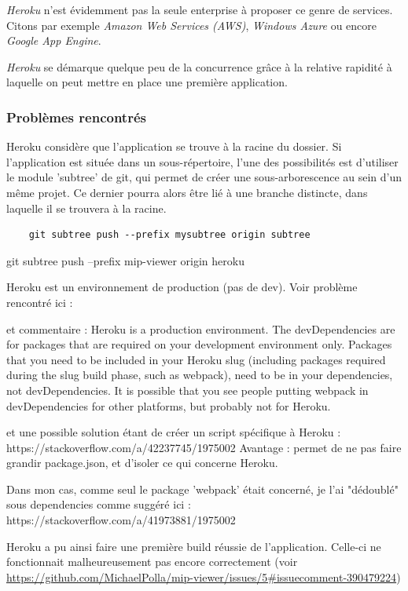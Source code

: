 \textit{Heroku} n'est évidemment pas la seule enterprise à proposer ce genre de services. Citons par exemple \textit{Amazon Web Services (AWS)}, \textit{Windows Azure} ou encore \textit{Google App Engine}.

\textit{Heroku} se démarque quelque peu de la concurrence grâce à la relative rapidité à laquelle on peut mettre en place une première application.


\subsubsection{Problèmes rencontrés}

Heroku considère que l'application se trouve à la racine du dossier.
Si l'application est située dans un sous-répertoire, l'une des possibilités est d'utiliser le module 'subtree' de git, qui permet de créer une sous-arborescence au sein d'un même projet. Ce dernier pourra alors être lié à une branche distincte, dans laquelle il se trouvera à la racine.
\begin{verbatim}
    git subtree push --prefix mysubtree origin subtree
\end{verbatim}

git subtree push --prefix mip-viewer origin heroku

Heroku est un environnement de production (pas de dev). Voir problème rencontré ici :

et commentaire :
Heroku is a production environment. The devDependencies are for packages that are required on your development environment only. Packages that you need to be included in your Heroku slug (including packages required during the slug build phase, such as webpack), need to be in your dependencies, not devDependencies. It is possible that you see people putting webpack in devDependencies for other platforms, but probably not for Heroku. 

et une possible solution étant de créer un script spécifique à Heroku : https://stackoverflow.com/a/42237745/1975002
Avantage : permet de ne pas faire grandir package.json, et d'isoler ce qui concerne Heroku.

Dans mon cas, comme seul le package 'webpack' était concerné, je l'ai "dédoublé" sous dependencies comme suggéré ici : https://stackoverflow.com/a/41973881/1975002

Heroku a pu ainsi faire une première build réussie de l'application. Celle-ci ne fonctionnait malheureusement pas encore correctement (voir \url{https://github.com/MichaelPolla/mip-viewer/issues/5\#issuecomment-390479224}) 